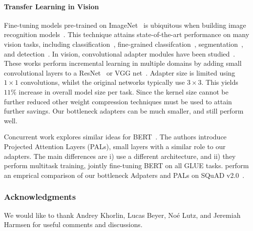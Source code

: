 \paragraph{Transfer Learning in Vision} Fine-tuning models pre-trained on ImageNet~\citep{deng2009} is ubiquitous when building image recognition models~\citep{yosinski2014,huh2016makes}. This technique attains state-of-the-art performance on many vision tasks, including classification~\citep{kornblith2018better}, fine-grained classifcation~\citep{hermans2017}, segmentation~\citep{long2015}, and detection~\citep{girshick2014}. In vision, convolutional adapter modules have been studied~\citep{rebuffi2017,rebuffi2018,rosenfeld2018incremental}. These works perform incremental learning in multiple domains by adding small convolutional layers to a ResNet~\citep{he2016} or VGG net~\citep{simonyan2014very}. Adapter size is limited using $1\times 1$ convolutions, whilst the original networks typically use $3\times 3$. This yields $11\%$ increase in overall model size per task. Since the kernel size cannot be further reduced other weight compression techniques must be used to attain further savings. Our bottleneck adapters can be much smaller, and still perform well.

Concurrent work explores similar ideas for BERT~\citep{stickland2019bert}. The authors introduce Projected Attention Layers (PALs), small layers with a similar role to our adapters. The main differences are i) \citet{stickland2019bert} use a different architecture, and ii) they perform multitask training, jointly fine-tuning BERT on all GLUE tasks.
\citet{semnani2019} perform an emprical comparison of our bottleneck Adpaters and PALs on SQuAD v2.0~\citep{rajpurkar2018}.

\subsubsection*{Acknowledgments}
We would like to thank Andrey Khorlin, Lucas Beyer,
No\'e Lutz, and Jeremiah Harmsen for useful comments and discussions.



